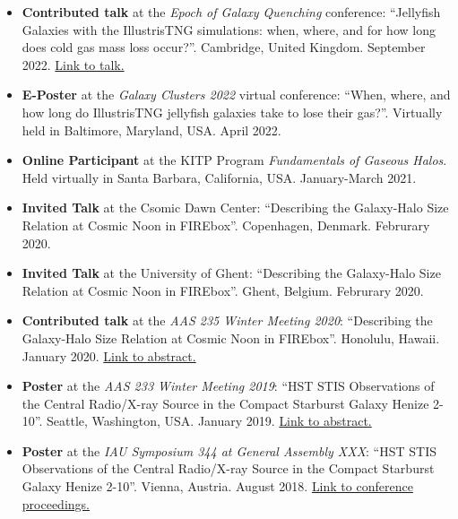\documentclass[a4paper,10pt,oneside]{article}
\begin{document}
\begin{itemize}[wide, labelwidth=!, labelindent=-11pt, parsep=0pt]
    \item {\bf Contributed talk} at the {\it Epoch of Galaxy Quenching} conference: ``Jellyfish Galaxies with the IllustrisTNG simulations: when, where, and for how long does cold gas mass loss occur?''. Cambridge, United Kingdom. September 2022. \href{https://sites.google.com/cam.ac.uk/quenching/programme#h.ohkoyw4ilbje}{Link to talk.}
    \item {\bf E-Poster} at the {\it Galaxy Clusters 2022} virtual conference: ``When, where, and how long do IllustrisTNG jellyfish galaxies take to lose their gas?''. Virtually held in Baltimore, Maryland, USA. April 2022.
    \item {\bf Online Participant} at the KITP Program {\it Fundamentals of Gaseous Halos}. Held virtually in Santa Barbara, California, USA. January-March 2021. 
    \item {\bf Invited Talk} at the Csomic Dawn Center: ``Describing the Galaxy-Halo Size Relation at Cosmic Noon in FIREbox''. Copenhagen, Denmark. Februrary 2020. 
    \item {\bf Invited Talk} at the University of Ghent: ``Describing the Galaxy-Halo Size Relation at Cosmic Noon in FIREbox''. Ghent, Belgium. Februrary 2020. 
    \item {\bf Contributed talk} at the {\it AAS 235 Winter Meeting 2020}: ``Describing the Galaxy-Halo Size Relation at Cosmic Noon in FIREbox''. Honolulu, Hawaii. January 2020. \href{https://ui.adsabs.harvard.edu/abs/2020AAS...23526001R/abstract}{Link to abstract.}
    \item {\bf Poster} at the {\it AAS 233 Winter Meeting 2019}: ``HST STIS Observations of the Central Radio/X-ray Source in the Compact Starburst Galaxy Henize 2-10''. Seattle, Washington, USA. January 2019. \href{https://ui.adsabs.harvard.edu/abs/2019AAS...23335119R/abstract}{Link to abstract.}
    \item {\bf Poster} at the {\it IAU Symposium 344 at General Assembly XXX}: ``HST STIS Observations of the Central Radio/X-ray Source in the Compact Starburst Galaxy Henize 2-10''. Vienna, Austria. August 2018. \href{https://doi.org/10.1017/S1743921318006282}{Link to conference proceedings.}
\end{itemize}

\noindent{}
\end{document}
